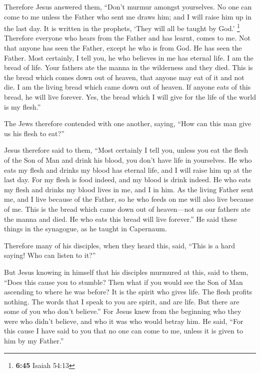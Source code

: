  Therefore Jesus answered them, ``Don't murmur amongst
yourselves.  No one can come to me unless the Father who
sent me draws him; and I will raise him up in the last day.
 It is written in the prophets, `They will all be taught
by God.' \footnote{\textbf{6:45} Isaiah 54:13} Therefore everyone who
hears from the Father and has learnt, comes to me.  Not
that anyone has seen the Father, except he who is from God. He has seen
the Father.  Most certainly, I tell you, he who believes
in me has eternal life.  I am the bread of life.
 Your fathers ate the manna in the wilderness and they
died.  This is the bread which comes down out of heaven,
that anyone may eat of it and not die.  I am the living
bread which came down out of heaven. If anyone eats of this bread, he
will live forever. Yes, the bread which I will give for the life of the
world is my flesh.''

 The Jews therefore contended with one another, saying,
``How can this man give us his flesh to eat?''

 Jesus therefore said to them, ``Most certainly I tell
you, unless you eat the flesh of the Son of Man and drink his blood, you
don't have life in yourselves.  He who eats my flesh and
drinks my blood has eternal life, and I will raise him up at the last
day.  For my flesh is food indeed, and my blood is drink
indeed.  He who eats my flesh and drinks my blood lives
in me, and I in him.  As the living Father sent me, and I
live because of the Father, so he who feeds on me will also live because
of me.  This is the bread which came down out of
heaven---not as our fathers ate the manna and died. He who eats this
bread will live forever.''  He said these things in the
synagogue, as he taught in Capernaum.

 Therefore many of his disciples, when they heard this,
said, ``This is a hard saying! Who can listen to it?''

 But Jesus knowing in himself that his disciples murmured
at this, said to them, ``Does this cause you to stumble? 
Then what if you would see the Son of Man ascending to where he was
before?  It is the spirit who gives life. The flesh
profits nothing. The words that I speak to you are spirit, and are life.
 But there are some of you who don't believe.'' For Jesus
knew from the beginning who they were who didn't believe, and who it was
who would betray him.  He said, ``For this cause I have
said to you that no one can come to me, unless it is given to him by my
Father.''

